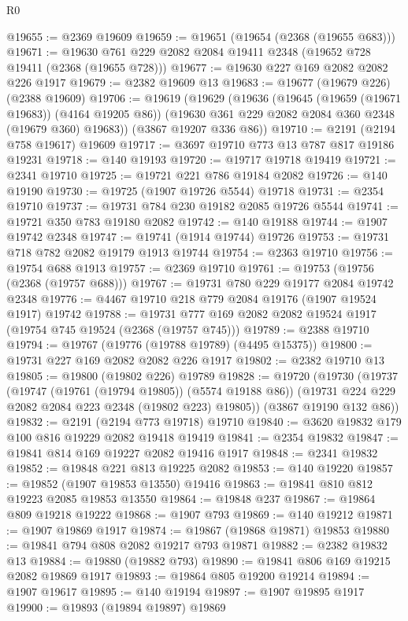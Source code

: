 \begin{lexlean}{R0}
\begin{coremodule}
@19655 := @2369 @19609
@19659 := @19651 (@19654 (@2368 (@19655 @683)))
@19671 := @19630 @761 @229 @2082 @2084 @19411 @2348 (@19652 @728 @19411 (@2368 (@19655 @728)))
@19677 := @19630 @227 @169 @2082 @2082 @226 @1917
@19679 := @2382 @19609 @13
@19683 := @19677 (@19679 @226) (@2388 @19609)
@19706 := @19619
    (@19629
      (@19636
        (@19645 (@19659 (@19671 @19683)) (@4164 @19205 @86))
        (@19630 @361 @229 @2082 @2084 @360 @2348 (@19679 @360) @19683))
      (@3867 @19207 @336 @86))
@19710 := @2191 (@2194 @758 @19617) @19609
@19717 := @3697 @19710 @773 @13 @787 @817 @19186 @19231
@19718 := @140 @19193
@19720 := @19717 @19718 @19419
@19721 := @2341 @19710
@19725 := @19721 @221 @786 @19184 @2082
@19726 := @140 @19190
@19730 := @19725 (@1907 @19726 @5544) @19718
@19731 := @2354 @19710
@19737 := @19731 @784 @230 @19182 @2085 @19726 @5544
@19741 := @19721 @350 @783 @19180 @2082
@19742 := @140 @19188
@19744 := @1907 @19742 @2348
@19747 := @19741 (@1914 @19744) @19726
@19753 := @19731 @718 @782 @2082 @19179 @1913 @19744
@19754 := @2363 @19710
@19756 := @19754 @688 @1913
@19757 := @2369 @19710
@19761 := @19753 (@19756 (@2368 (@19757 @688)))
@19767 := @19731 @780 @229 @19177 @2084 @19742 @2348
@19776 := @4467 @19710 @218 @779 @2084 @19176 (@1907 @19524 @1917) @19742
@19788 := @19731 @777 @169 @2082 @2082 @19524 @1917 (@19754 @745 @19524 (@2368 (@19757 @745)))
@19789 := @2388 @19710
@19794 := @19767 (@19776 (@19788 @19789) (@4495 @15375))
@19800 := @19731 @227 @169 @2082 @2082 @226 @1917
@19802 := @2382 @19710 @13
@19805 := @19800 (@19802 @226) @19789
@19828 := @19720
    (@19730
      (@19737
        (@19747 (@19761 (@19794 @19805)) (@5574 @19188 @86))
        (@19731 @224 @229 @2082 @2084 @223 @2348 (@19802 @223) @19805))
      (@3867 @19190 @132 @86))
@19832 := @2191 (@2194 @773 @19718) @19710
@19840 := @3620 @19832 @179 @100 @816 @19229 @2082 @19418 @19419
@19841 := @2354 @19832
@19847 := @19841 @814 @169 @19227 @2082 @19416 @1917
@19848 := @2341 @19832
@19852 := @19848 @221 @813 @19225 @2082
@19853 := @140 @19220
@19857 := @19852 (@1907 @19853 @13550) @19416
@19863 := @19841 @810 @812 @19223 @2085 @19853 @13550
@19864 := @19848 @237
@19867 := @19864 @809 @19218 @19222
@19868 := @1907 @793
@19869 := @140 @19212
@19871 := @1907 @19869 @1917
@19874 := @19867 (@19868 @19871) @19853
@19880 := @19841 @794 @808 @2082 @19217 @793 @19871
@19882 := @2382 @19832 @13
@19884 := @19880 (@19882 @793)
@19890 := @19841 @806 @169 @19215 @2082 @19869 @1917
@19893 := @19864 @805 @19200 @19214
@19894 := @1907 @19617
@19895 := @140 @19194
@19897 := @1907 @19895 @1917
@19900 := @19893 (@19894 @19897) @19869

\end{coremodule}
\end{lexlean}
